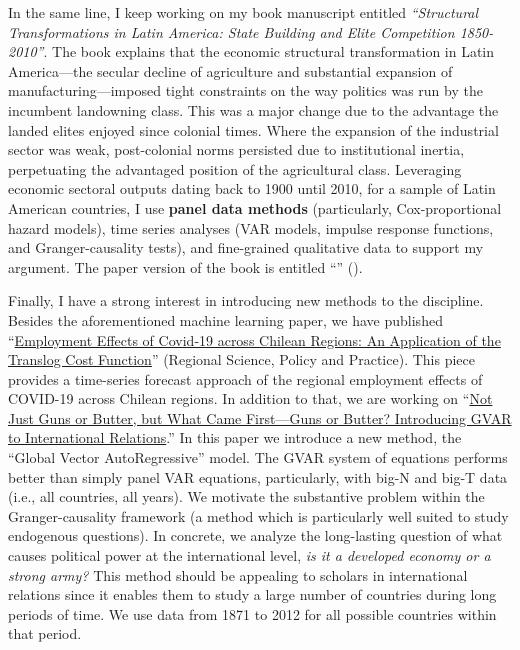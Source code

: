\documentclass[10pt,stdletter,dateno,sigleft]{newlfm} %
\begin{document}
\begin{newlfm}
In the same line, I keep working on my book manuscript entitled \emph{``Structural Transformations in Latin America: State Building and Elite Competition 1850-2010''}. The book explains that the economic structural transformation in Latin America---the secular decline of agriculture and substantial expansion of manufacturing---imposed tight constraints on the way politics was run by the incumbent landowning class. This was a major change due to the advantage the landed elites enjoyed since colonial times. Where the expansion of the industrial sector was weak, post-colonial norms persisted due to institutional inertia, perpetuating the advantaged position of the agricultural class. Leveraging economic sectoral outputs dating back to 1900 until 2010, for a sample of Latin American countries, I use {\bf panel data methods} (particularly, Cox-proportional hazard models), time series analyses (VAR models, impulse response functions, and Granger-causality tests), and fine-grained qualitative data to support my argument. The paper version of the book is entitled ``\href{https://github.com/hbahamonde/Earthquake_Paper/raw/master/Bahamonde_Earthquake_Paper.pdf}{{\unskip}}'' (\emph{\unskip}).

Finally, I have a strong interest in introducing new methods to the discipline. Besides the aforementioned machine learning paper, we have published ``\href{https://doi.org/10.1111/rsp3.12337}{Employment Effects of Covid‐19 across Chilean Regions: An Application of the Translog Cost Function}'' (Regional Science, Policy and Practice).  This piece provides a time-series forecast approach of the regional employment effects of COVID-19 across Chilean regions. In addition to that, we are working on ``\href{https://github.com/hbahamonde/Bahamonde_Kovac/raw/master/abstract.txt}{Not Just Guns or Butter, but What Came First---Guns or Butter? Introducing GVAR to International Relations}.'' In this paper we introduce a new method, the ``Global Vector AutoRegressive'' model. The GVAR system of equations performs better than simply panel VAR equations, particularly, with big-N and big-T data (i.e., all countries, all years). We motivate the substantive problem within the Granger-causality framework (a method which is particularly well suited to study endogenous questions). In concrete, we analyze the long-lasting question of what causes political power at the international level, \emph{is it a developed economy or a strong army?} This method should be appealing to scholars in international relations since it enables them to study a large number of countries during long periods of time. We use data from 1871 to 2012 for all possible countries within that period.


\end{newlfm}
\end{document}
